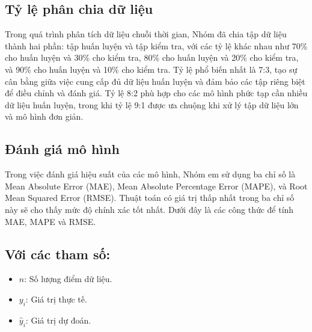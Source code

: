 \subsection{Tỷ lệ phân chia dữ liệu}
Trong quá trình phân tích dữ liệu chuỗi thời gian, Nhóm đã chia tập dữ liệu thành hai phần: tập huấn luyện và tập kiểm tra, với các tỷ lệ khác nhau như 70\% cho huấn luyện và 30\% cho kiểm tra, 80\% cho huấn luyện và 20\% cho kiểm tra, và 90\% cho huấn luyện và 10\% cho kiểm tra. Tỷ lệ phổ biến nhất là 7:3, tạo sự cân bằng giữa việc cung cấp đủ dữ liệu huấn luyện và đảm bảo các tập riêng biệt để điều chỉnh và đánh giá. Tỷ lệ 8:2 phù hợp cho các mô hình phức tạp cần nhiều dữ liệu huấn luyện, trong khi tỷ lệ 9:1 được ưa chuộng khi xử lý tập dữ liệu lớn và mô hình đơn giản.

\subsection{Đánh giá mô hình}
Trong việc đánh giá hiệu suất của các mô hình, Nhóm em sử dụng ba chỉ số là Mean Absolute Error (MAE), Mean Absolute Percentage Error (MAPE), và Root Mean Squared Error (RMSE). Thuật toán có giá trị thấp nhất trong ba chỉ số này sẽ cho thấy mức độ chính xác tốt nhất. Dưới đây là các công thức để tính MAE, MAPE và RMSE.
\subsection*{Với các tham số: }
\begin{itemize}
    \item \( n \): Số lượng điểm dữ liệu.
    \item \( y_i \): Giá trị thực tế.
    \item \( \hat{y}_i \): Giá trị dự đoán.
\end{itemize}

